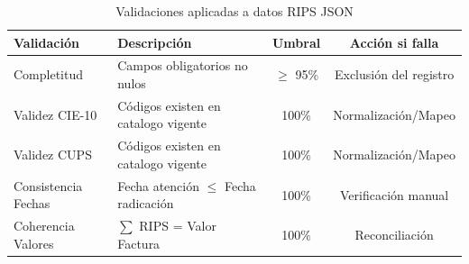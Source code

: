 \documentclass[12pt,letterpaper]{report}
\begin{document}
\begin{table}[H]
\centering
\caption{Validaciones aplicadas a datos RIPS JSON}
\footnotesize
\begin{tabular}{@{}llcc@{}}
\toprule
\textbf{Validación} & \textbf{Descripción} & \textbf{Umbral} & \textbf{Acción si falla} \\
\midrule
Completitud & Campos obligatorios no nulos & $\geq$ 95\% & Exclusión del registro \\
Validez CIE-10 & Códigos existen en catalogo vigente & 100\% & Normalización/Mapeo \\
Validez CUPS & Códigos existen en catalogo vigente & 100\% & Normalización/Mapeo \\
Consistencia Fechas & Fecha atención $\leq$ Fecha radicación & 100\% & Verificación manual \\
Coherencia Valores & $\sum$ RIPS = Valor Factura & 100\% & Reconciliación \\
\bottomrule
\end{tabular}
\end{table}
\end{document}
